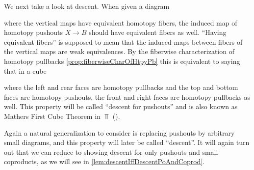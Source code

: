 We next take a look at descent.
When given a diagram 
\begin{center}
\end{center}
where the vertical maps have equivalent homotopy fibers, the induced map of homotopy pushouts $X\to B$ should have equivalent fibers as well.
``Having equivalent fibers'' is supposed to mean that the induced maps between fibers of the vertical maps are weak equivalences.
By the fiberwise characterization of homotopy pullbacks \cref{prop:fiberwiseCharOfHtpyPb} this is equivalent to saying that in a cube 
\begin{center}
\end{center}
where the left and rear faces are homotopy pullbacks and the top and bottom faces are homotopy pushouts, the front and right faces are homotopy pullbacks as well.
This property will be called ``descent for pushouts'' and is also known as Mathers First Cube Theorem in $\Top$ (\cite[Theorem 18]{mather_1976}).

Again a natural generalization to consider is replacing pushouts by arbitrary small diagrams, and this property will later be called ``descent''.
It will again turn out that we can reduce to showing descent for only pushouts and small coproducts, as we will see in \cref{lem:descentIffDescentPoAndCoprod}.